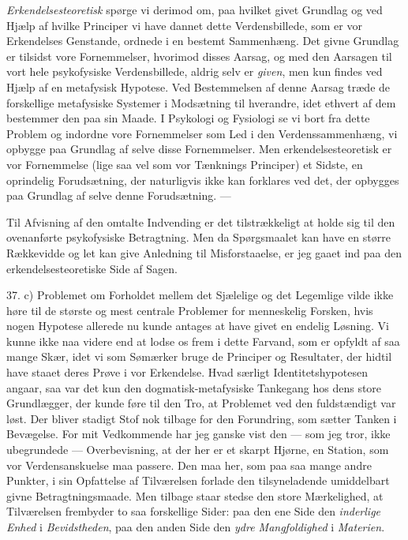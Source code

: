\documentclass[12pt,a4paper,openany]{book}
\begin{document}
\emph{Erkendelsesteoretisk} spørge vi derimod om, paa hvilket givet Grundlag og
ved Hjælp af hvilke Principer vi have dannet dette Verdensbillede, som er vor
Erkendelses Genstande, ordnede i en bestemt Sammenhæng. Det givne Grundlag er
tilsidst vore Fornemmelser, hvorimod disses Aarsag, og med den Aarsagen til
vort hele psykofysiske Verdensbillede, aldrig selv er \emph{given}, men kun
findes ved Hjælp af en metafysisk Hypotese. Ved Bestemmelsen af denne Aarsag
træde de forskellige metafysiske Systemer i Modsætning til hverandre, idet
ethvert af dem bestemmer den paa sin Maade. I Psykologi og Fysiologi se vi bort
fra dette Problem og indordne vore Fornemmelser som Led i den
Verdenssammenhæng, vi opbygge paa Grundlag af selve disse Fornemmelser. Men
erkendelsesteoretisk er vor Fornemmelse (lige saa vel som vor Tænknings
Principer) et Sidste, en oprindelig Forudsætning, der naturligvis ikke kan
forklares ved det, der opbygges paa Grundlag af selve denne Forudsætning. ---

Til Afvisning af den omtalte Indvending er det tilstrækkeligt at holde sig til
den ovenanførte psykofysiske Betragtning. Men da Spørgsmaalet kan have en
større Rækkevidde og let kan give Anledning til Misforstaaelse, er jeg gaaet
ind paa den erkendelsesteoretiske Side af Sagen.

37. c) Problemet om Forholdet mellem det Sjælelige og det Legemlige vilde ikke
høre til de største og mest centrale Problemer for menneskelig Forsken, hvis
nogen Hypotese allerede nu kunde antages at have givet en endelig Løsning. Vi
kunne ikke naa videre end at lodse os frem i dette Farvand, som er opfyldt af
saa mange Skær, idet vi som Sømærker bruge de Principer og Resultater, der
hidtil have staaet deres Prøve i vor Erkendelse. Hvad særligt
Identitetshypotesen angaar, saa var det kun den dogmatisk-metafysiske Tankegang
hos dens store Grundlægger, der kunde føre til den Tro, at Problemet ved den
fuldstændigt var løst. Der bliver stadigt Stof nok tilbage for den Forundring,
som sætter Tanken i Bevægelse. For mit Vedkommende har jeg ganske vist den ---
som jeg tror, ikke ubegrundede --- Overbevisning, at der her er et skarpt
Hjørne, en Station, som vor Verdensanskuelse maa passere. Den maa her, som paa
saa mange andre Punkter, i sin Opfattelse af Tilværelsen forlade den
tilsyneladende umiddelbart givne Betragtningsmaade. Men tilbage staar stedse
den store Mærkelighed, at Tilværelsen frembyder to saa forskellige Sider: paa
den ene Side den \emph{inderlige Enhed} i \emph{Bevidstheden}, paa den anden
Side den \emph{ydre Mangfoldighed} i \emph{Materien}.
\end{document}
